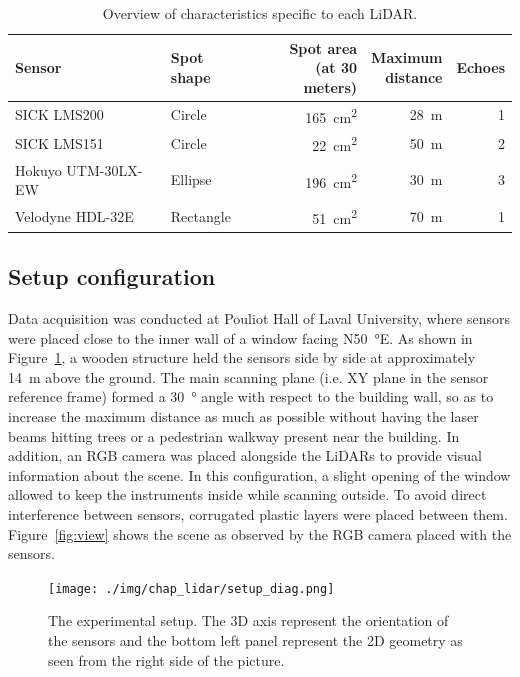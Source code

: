 \begin{table}[h]
    \centering
    \begin{tabular}{@{}llrrr@{}}
        \toprule
        \textbf{Sensor} & \textbf{Spot shape} & \makecell[rc]{\textbf{Spot area} \\ (at 30 meters)} & \makecell[rc]{\textbf{Maximum} \\ \textbf{distance}} & \textbf{Echoes} \\
        \hline
        SICK LMS200         & Circle    & \SI{165}{\centi\meter\squared} & \SI{28}{\meter} & 1 \\
        SICK LMS151         & Circle    & \SI{22}{\centi\meter\squared}  & \SI{50}{\meter} & 2 \\
        Hokuyo UTM-30LX-EW  & Ellipse   & \SI{196}{\centi\meter\squared} & \SI{30}{\meter} & 3 \\
        Velodyne HDL-32E    & Rectangle & \SI{51}{\centi\meter\squared}  & \SI{70}{\meter} & 1 \\
        \bottomrule
    \end{tabular}
    \caption{Overview of characteristics specific to each LiDAR.}
    \label{tab:lidars}
\end{table}

\subsection{Setup configuration}

Data acquisition was conducted at Pouliot Hall of Laval University, where sensors were placed close to the inner wall of a window facing N\SI{50}{\degree}E. As shown in Figure~\ref{fig:setup}, a wooden structure held the sensors side by side at approximately \SI{14}{\meter} above the ground. The main scanning plane (i.e. XY plane in the sensor reference frame) formed a \SI{30}{\degree} angle with respect to the building wall, so as to increase the maximum distance as much as possible without having the laser beams hitting  trees or a pedestrian walkway present near the building. In addition, an RGB camera was placed alongside the LiDARs to provide visual information about the scene. In this configuration, a slight opening of the window allowed to keep the instruments inside while scanning outside. To avoid direct interference between sensors, corrugated plastic layers were placed between them. Figure~\ref{fig:view} shows the scene as observed by the RGB camera placed with the sensors.

\begin{figure}[h]
    \centering
    \texttt{[image: ./img/chap\_lidar/setup\_diag.png]}
    \caption{The experimental setup. The 3D axis represent the orientation of the sensors and the bottom left panel represent the 2D geometry as seen from the right side of the picture.}
    \label{fig:setup}
\end{figure}

